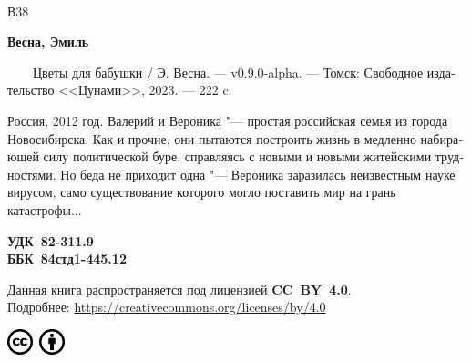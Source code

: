 \documentclass[a5paper,12pt,fleqn]{extbook}\usepackage{cooltooltips}\usepackage{polyglossia}\setdefaultlanguage[babelshorthands=true]{russian}\setotherlanguage{english}\defaultfontfeatures{Ligatures=TeX,Mapping=tex-text} \usepackage{xcolor}\definecolor{lightgray}{HTML}{bbbbbb}\color{lightgray}\newcommand{\ml}[3]{\textenglish{\textcolor{black}{#3}}}
\newcommand{\UDK}{82-311.9}
\newcommand{\BBK}{84стд1-445.12}
\newcommand{\AuthorCode}{В38}
\newcommand{\BookVersion}{v0.9.0-alpha}
\begin{document}
\begin{minipage}[t]{0.05\textwidth}~\\\AuthorCode \end{minipage}
\begin{minipage}[t]{0.9\textwidth}
\textbf{Весна, Эмиль}

~~~~Цветы для бабушки / Э. Весна. --- \BookVersion. --- Томск: Свободное издательство <<Цунами>>, 2023. --- 222 c.

\vspace{1em}

{\small
Россия, 2012 год.
Валерий и Вероника "--- простая российская семья из города Новосибирска.
Как и прочие, они пытаются построить жизнь в медленно набирающей силу политической буре, справляясь с новыми и новыми житейскими трудностями.
Но беда не приходит одна "--- Вероника заразилась неизвестным науке вирусом, само существование которого могло поставить мир на грань катастрофы...
\par}

\vspace{1em}

\hfill \begin{minipage}[t]{0.35\textwidth}{\textbf{УДК~\UDK\\ББК~\BBK}\par}\end{minipage}

\vspace{2em}

{\small
Данная книга распространяется под лицензией \textbf{CC~BY~4.0}.\\
Подробнее: \href{https://creativecommons.org/licenses/by/4.0}{https://creativecommons.org/licenses/by/4.0}
\par}

\vspace{1em}

\includegraphics[width=2em]{../images/cc.pdf}~\includegraphics[width=2em]{../images/by.pdf}

\end{minipage}
\end{document}
